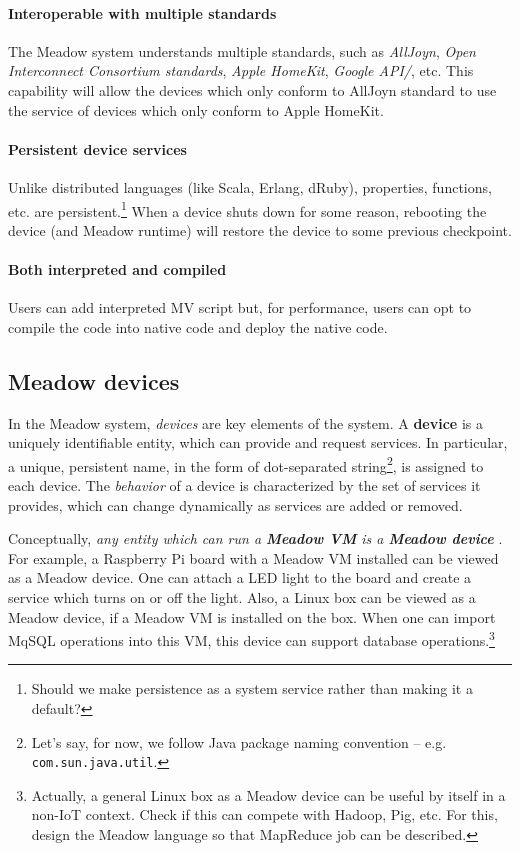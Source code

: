 \documentclass{note}
\begin{document}
\paragraph{Interoperable with multiple standards}
The Meadow system understands multiple standards, such as 
{\em AllJoyn\/}, {\em Open Interconnect
Consortium standards\/},  {\em Apple HomeKit\/}, {\em Google API/}, etc.
This capability will allow the devices which only conform to AllJoyn standard
to use the service of devices which only conform to Apple HomeKit. 

\paragraph{Persistent device services}
Unlike distributed languages (like Scala, Erlang, dRuby), properties,
   functions, etc. are persistent.\footnote{\textcolor{green2}{Should we make
       persistence as a system service rather than making it a default?}} 
   When a device shuts down for some reason, rebooting the device (and Meadow
   runtime) will restore the device to some previous checkpoint.

\paragraph{Both interpreted and compiled}
Users can add interpreted MV script
but, for performance, users can opt to compile the code into native code and 
deploy the native code.

\subsection{Meadow devices}
In the Meadow system, {\em devices\/} are key elements of the
system. A \textcolor{blue2}{\bf{}device} is a uniquely identifiable entity,
which can provide and request services. 
In particular, a unique, persistent name, in the form of dot-separated
string\footnote{Let's say, for now, we follow Java package naming convention
  -- e.g. \texttt{com.sun.java.util}.},
is assigned to each device. The {\em behavior\/} of a device is characterized
by the set of services it provides, which can change dynamically as
services are added or removed. 

Conceptually, \textcolor{blue2}{\em any entity which can run a
  \textcolor{blue2}{\bf{}\em Meadow VM} is a {\bf\em Meadow device} \/}. 
For example, a Raspberry Pi board with a Meadow VM installed can be viewed as a
Meadow device. One can attach a LED light to the board and create a service 
which turns on or off the light.
Also, a Linux box can be viewed as a Meadow
device, if a Meadow VM is installed on the box.
When one can import MqSQL operations into this VM, this device can support
database operations.\footnote{\textcolor{green2}{Actually, a general Linux box
    as a Meadow device can be useful by itself in a non-IoT context. 
    Check if this can
    compete with Hadoop, Pig, etc. For this, design the Meadow language so that
    MapReduce job can be described.}}
\end{document}
